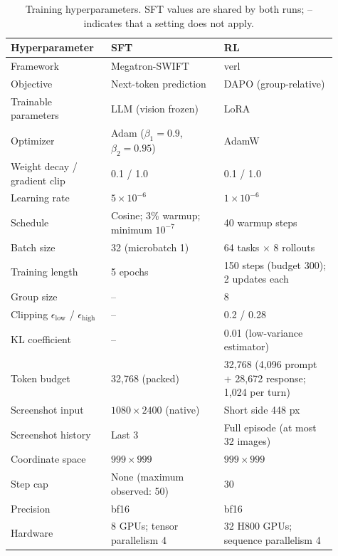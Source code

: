 \begin{table}[H]
\centering
\small
\caption{Training hyperparameters. SFT values are shared by both runs; -- indicates that a setting does not apply.}
\label{tab:app-hparams}
\setlength{\tabcolsep}{3pt}
\begin{tabular}{p{0.27\linewidth}p{0.32\linewidth}p{0.32\linewidth}}
\toprule
Hyperparameter & SFT & RL \\
\midrule
Framework & Megatron-SWIFT & verl \\
Objective & Next-token prediction & DAPO (group-relative) \\
Trainable parameters & LLM (vision frozen) & LoRA \\
Optimizer & Adam ($\beta_1{=}0.9$, $\beta_2{=}0.95$) & AdamW \\
Weight decay / gradient clip & 0.1 / 1.0 & 0.1 / 1.0 \\
Learning rate & $5\times10^{-6}$ & $1\times10^{-6}$ \\
Schedule & Cosine; 3\% warmup; minimum $10^{-7}$ & 40 warmup steps \\
Batch size & 32 (microbatch 1) & 64 tasks $\times$ 8 rollouts \\
Training length & 5 epochs & 150 steps (budget 300); 2 updates each \\
Group size & -- & 8 \\
Clipping $\epsilon_{\text{low}}$ / $\epsilon_{\text{high}}$ & -- & 0.2 / 0.28 \\
KL coefficient & -- & 0.01 (low-variance estimator) \\
Token budget & 32,768 (packed) & 32,768 (4,096 prompt + 28,672 response; 1,024 per turn) \\
Screenshot input & $1080\times2400$ (native) & Short side 448 px \\
Screenshot history & Last 3 & Full episode (at most 32 images) \\
Coordinate space & $999\times999$ & $999\times999$ \\
Step cap & None (maximum observed: 50) & 30 \\
Precision & bf16 & bf16 \\
Hardware & 8 GPUs; tensor parallelism 4 & 32 H800 GPUs; sequence parallelism 4 \\
\bottomrule
\end{tabular}
\end{table}


